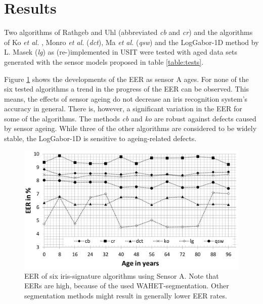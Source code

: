 \documentclass[10pt,twocolumn,letterpaper]{article}
\providecommand{\etal}[0]{\textit{et al.} }
\begin{document}
 \section{Results}
 \label{results}
 Two algorithms of Rathgeb and Uhl (abbreviated \emph{cb} and \emph{cr}) 
 and the algorithms of Ko \etal,
Monro \etal (\emph{dct}),
 Ma \etal(\emph{qsw})
  and the LogGabor-1D method by L. Masek (\emph{lg}) as (re-)implemented in USIT were tested with aged data sets generated with the sensor models proposed in table \ref{table:tests}.
 
 Figure \ref{fig:sensor1} shows the developments of the EER as sensor A ages. For none of the six tested algorithms a trend in the progress of the EER can be observed. This means, the effects of sensor ageing do not decrease an iris recognition system's accuracy in general. There is, however, a significant variation in the EER for some of the algorithms. The methods \emph{cb} and \emph{ko} are robust against defects caused by sensor ageing. While three of the other algorithms are considered to be widely stable, the LogGabor-1D is sensitive to ageing-related defects. 
 
  \begin{figure}
  \centering
  \includegraphics[width=\linewidth]{img/sensor1.png}
  \caption{EER of six iris-signature algorithms using Sensor A. Note that EERs are high, because of the used WAHET-segmentation. Other segmentation methods might result in generally lower EER rates.}
  \label{fig:sensor1}
\end{figure}
\end{document}
